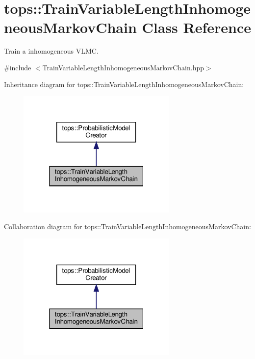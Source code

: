\hypertarget{classtops_1_1TrainVariableLengthInhomogeneousMarkovChain}{}\section{tops\+:\+:Train\+Variable\+Length\+Inhomogeneous\+Markov\+Chain Class Reference}
\label{classtops_1_1TrainVariableLengthInhomogeneousMarkovChain}


Train a inhomogeneous V\+L\+MC.  




{\ttfamily \#include $<$Train\+Variable\+Length\+Inhomogeneous\+Markov\+Chain.\+hpp$>$}



Inheritance diagram for tops\+:\+:Train\+Variable\+Length\+Inhomogeneous\+Markov\+Chain\+:
\nopagebreak
\begin{figure}[H]
\begin{center}
\leavevmode
\includegraphics[width=223pt]{classtops_1_1TrainVariableLengthInhomogeneousMarkovChain__inherit__graph}
\end{center}
\end{figure}


Collaboration diagram for tops\+:\+:Train\+Variable\+Length\+Inhomogeneous\+Markov\+Chain\+:
\nopagebreak
\begin{figure}[H]
\begin{center}
\leavevmode
\includegraphics[width=223pt]{classtops_1_1TrainVariableLengthInhomogeneousMarkovChain__coll__graph}
\end{center}
\end{figure}
